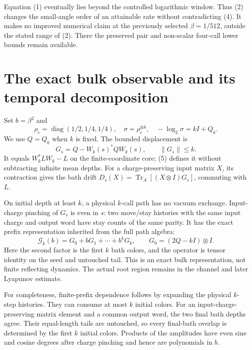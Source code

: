 \documentclass[11pt]{article}
\newcommand{\Tr}{\operatorname{Tr}}
\newcommand{\norm}[1]{\lVert #1\rVert}
\begin{document}
Equation (1) eventually lies beyond the controlled logarithmic window.
Thus (2) changes the small-angle order of an attainable rate without
contradicting (4). It makes no improved numerical claim at the previously
selected $\beta=1/512$, outside the stated range of (2). There the
preserved pair and non-scalar four-call lower bounds remain available.

\section{The exact bulk observable and its temporal decomposition}

Set $b=\beta^2$ and
\[
 \rho_c=\operatorname{diag}(1/2,1/4,1/4),\quad
 \sigma=\rho_c^{\otimes k},\quad -\log_2\sigma=kI+Q_k.
\]
We use $Q=Q_k$ when $k$ is fixed. The bounded displacement is
\[
 G_s=Q-W_k(s)^*QW_k(s),\qquad \norm{G_s}\le k.
 \tag{5}
\]
It equals $W_k^*LW_k-L$ on the finite-coordinate core; (5) defines it
without subtracting infinite mean depths. For a charge-preserving input
matrix $X$, its contraction gives the bath drift
$D_s(X)=\Tr_A[(X\otimes I)G_s]$, commuting with $L$.

On initial depth at least $k$, a physical $k$-call path has no vacuum
exchange. Input-charge pinching of $G_s$ is even in $s$: two move/stay
histories with the same input charge and output word have stay counts
of the same parity. It has the exact prefix representation inherited
from the full path algebra:
\[
 \mathcal G_k(b)=G_0+bG_1+\cdots+b^kG_k,\qquad
 G_0=(2Q-kI)\otimes I.
 \tag{6}
\]
Here the second factor is the first $k$ bath colors, and the operator
is tensor identity on the seed and untouched tail. This is an exact
bulk representation, not finite reflecting dynamics. The actual root
region remains in the channel and later Lyapunov estimate.

For completeness, finite-prefix dependence follows by expanding the
physical $k$-step histories. They can consume at most $k$ initial
colors. For an input-charge-preserving matrix element and a common
output word, the two final bath depths agree. Their equal-length tails
are untouched, so every final-bath overlap is determined by the first
$k$ initial colors. Products of the amplitudes have even sine and cosine
degrees after charge pinching and hence are polynomials in $b$.
\end{document}
